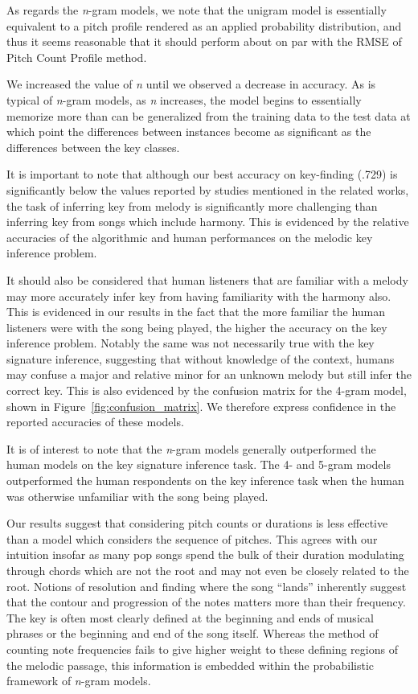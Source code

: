 \documentclass[letterpaper]{article}
\begin{document}
As regards the \emph{n}-gram models, we note that the unigram model is essentially equivalent to a pitch profile rendered as an applied probability distribution, and thus it seems reasonable that it should perform about on par with the RMSE of Pitch Count Profile method.

We increased the value of \emph{n} until we observed a decrease in accuracy. As is typical of \emph{n}-gram models, as \emph{n} increases, the model begins to essentially memorize more than can be generalized from the training data to the test data at which point the differences between instances become as significant as the differences between the key classes.

It is important to note that although our best accuracy on key-finding (.729) is significantly below the values reported by studies mentioned in the related works, the task of inferring key from melody is significantly more challenging than inferring key from songs which include harmony. This is evidenced by the relative accuracies of the algorithmic and human performances on the melodic key inference problem. 

It should also be considered that human listeners that are familiar with a melody may more accurately infer key from having familiarity with the harmony also. This is evidenced in our results in the fact that the more familiar the human listeners were with the song being played, the higher the accuracy on the key inference problem. Notably the same was not necessarily true with the key signature inference, suggesting that without knowledge of the context, humans may confuse a major and relative minor for an unknown melody but still infer the correct key. This is also evidenced by the confusion matrix for the 4-gram model, shown in Figure~\ref{fig:confusion_matrix}. We therefore express confidence in the reported accuracies of these models.

It is of interest to note that the \emph{n}-gram models generally outperformed the human models on the key signature inference task. The 4- and 5-gram models outperformed the human respondents on the key inference task when the human was otherwise unfamiliar with the song being played. 

Our results suggest that considering pitch counts or durations is less effective than a model which considers the sequence of pitches. This agrees with our intuition insofar as many pop songs spend the bulk of their duration modulating through chords which are not the root and may not even be closely related to the root. Notions of resolution and finding where the song ``lands'' inherently suggest that the contour and progression of the notes matters more than their frequency. The key is often most clearly defined at the beginning and ends of musical phrases or the beginning and end of the song itself. Whereas the method of counting note frequencies fails to give higher weight to these defining regions of the melodic passage, this information is embedded within the probabilistic framework of \emph{n}-gram models.
\end{document}

